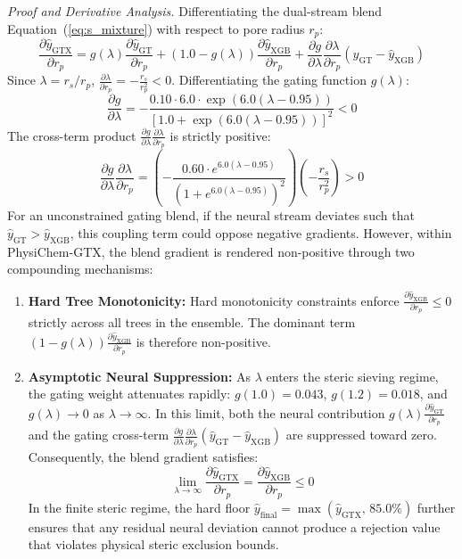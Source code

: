 \documentclass[11pt]{article}
\begin{document}
\noindent\textit{Proof and Derivative Analysis.} Differentiating the dual-stream blend Equation~(\ref{eq:s_mixture}) with respect to pore radius $r_p$:
\begin{equation}
\frac{\partial \hat{y}_{\mathrm{GTX}}}{\partial r_p} = g(\lambda) \frac{\partial \hat{y}_{\mathrm{GT}}}{\partial r_p} + \left(1.0 - g(\lambda)\right) \frac{\partial \hat{y}_{\mathrm{XGB}}}{\partial r_p} + \frac{\partial g}{\partial \lambda} \frac{\partial \lambda}{\partial r_p} \left( \hat{y}_{\mathrm{GT}} - \hat{y}_{\mathrm{XGB}} \right)
\label{eq:s_diff_proof}
\end{equation}
Since $\lambda = r_s / r_p$, $\frac{\partial \lambda}{\partial r_p} = -\frac{r_s}{r_p^2} < 0$. Differentiating the gating function $g(\lambda)$:
\begin{equation}
\frac{\partial g}{\partial \lambda} = -\frac{0.10 \cdot 6.0 \cdot \exp\left(6.0(\lambda - 0.95)\right)}{\left[ 1.0 + \exp\left(6.0(\lambda - 0.95)\right) \right]^2} < 0
\label{eq:s_dg_dlambda}
\end{equation}
The cross-term product $\frac{\partial g}{\partial \lambda} \frac{\partial \lambda}{\partial r_p}$ is strictly positive:
\begin{equation}
\frac{\partial g}{\partial \lambda} \frac{\partial \lambda}{\partial r_p} = \left( -\frac{0.60 \cdot e^{6.0(\lambda - 0.95)}}{\left(1 + e^{6.0(\lambda - 0.95)}\right)^2} \right) \left( -\frac{r_s}{r_p^2} \right) > 0
\end{equation}
For an unconstrained gating blend, if the neural stream deviates such that $\hat{y}_{\mathrm{GT}} > \hat{y}_{\mathrm{XGB}}$, this coupling term could oppose negative gradients. However, within PhysiChem-GTX, the blend gradient is rendered non-positive through two compounding mechanisms:
\begin{enumerate}[leftmargin=0.8cm]
    \item \textbf{Hard Tree Monotonicity:} Hard monotonicity constraints enforce $\frac{\partial \hat{y}_{\mathrm{XGB}}}{\partial r_p} \le 0$ strictly across all trees in the ensemble. The dominant term $(1 - g(\lambda))\frac{\partial \hat{y}_{\mathrm{XGB}}}{\partial r_p}$ is therefore non-positive.
    \item \textbf{Asymptotic Neural Suppression:} As $\lambda$ enters the steric sieving regime, the gating weight attenuates rapidly: $g(1.0) = 0.043$, $g(1.2) = 0.018$, and $g(\lambda) \to 0$ as $\lambda \to \infty$. In this limit, both the neural contribution $g(\lambda)\frac{\partial \hat{y}_{\mathrm{GT}}}{\partial r_p}$ and the gating cross-term $\frac{\partial g}{\partial \lambda}\frac{\partial \lambda}{\partial r_p}(\hat{y}_{\mathrm{GT}} - \hat{y}_{\mathrm{XGB}})$ are suppressed toward zero. Consequently, the blend gradient satisfies:
    \begin{equation}
    \lim_{\lambda \to \infty} \frac{\partial \hat{y}_{\mathrm{GTX}}}{\partial r_p} = \frac{\partial \hat{y}_{\mathrm{XGB}}}{\partial r_p} \le 0
    \end{equation}
    In the finite steric regime, the hard floor $\hat{y}_{\mathrm{final}} = \max(\hat{y}_{\mathrm{GTX}},\, 85.0\%)$ further ensures that any residual neural deviation cannot produce a rejection value that violates physical steric exclusion bounds.
\end{enumerate}
\end{document}
